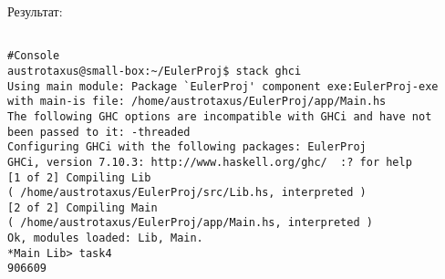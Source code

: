 \documentclass[11pt,a4paper]{article}
\begin{document}
Результат:


\begin{lstlisting}[frame=single]

#Console
austrotaxus@small-box:~/EulerProj$ stack ghci
Using main module: Package `EulerProj' component exe:EulerProj-exe
with main-is file: /home/austrotaxus/EulerProj/app/Main.hs
The following GHC options are incompatible with GHCi and have not
been passed to it: -threaded
Configuring GHCi with the following packages: EulerProj
GHCi, version 7.10.3: http://www.haskell.org/ghc/  :? for help
[1 of 2] Compiling Lib
( /home/austrotaxus/EulerProj/src/Lib.hs, interpreted )
[2 of 2] Compiling Main
( /home/austrotaxus/EulerProj/app/Main.hs, interpreted )
Ok, modules loaded: Lib, Main. 
*Main Lib> task4
906609

\end{lstlisting}
\end{document}
